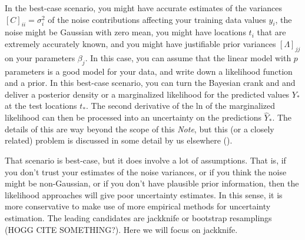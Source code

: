\documentclass[12pt,letterpaper]{article}
\newcommand{\documentname}{\textsl{Note}}
\begin{document}
In the best-case scenario, you might have accurate estimates of the variances $[C]_{ii} = \sigma_i^2$ of the noise contributions affecting your training data values $y_i$, the noise might be Gaussian with zero mean, you might have locations $t_i$ that are extremely accurately known, and you might have justifiable prior variances $[\Lambda]_{jj}$ on your parameters $\beta_j$.
In this case, you can assume that the linear model with $p$ parameters is a good model for your data, and write down a likelihood function and a prior.
In this best-case scenario, you can turn the Bayesian crank and and deliver a posterior density or a marginalized likelihood for the predicted values $Y_\ast$ at the test locations $t_\ast$.
The second derivative of the ln of the marginalized likelihood can then be processed into an uncertainty on the predictions $\hat{Y}_\ast$.
The details of this are way beyond the scope of this \documentname, but this (or a closely related) problem is discussed in some detail by us elsewhere (\citealt{products}).

That scenario is best-case, but it does involve a lot of assumptions.
That is, if you don't trust your estimates of the noise variances, or if you think the noise might be non-Gaussian, or if you don't have plausible prior information, then the likelihood approaches will give poor uncertainty estimates.
In this sense, it is more conservative to make use of more empirical methods for uncertainty estimation.
The leading candidates are jackknife or bootstrap resamplings (HOGG CITE SOMETHING?).
Here we will focus on jackknife.
\end{document}
